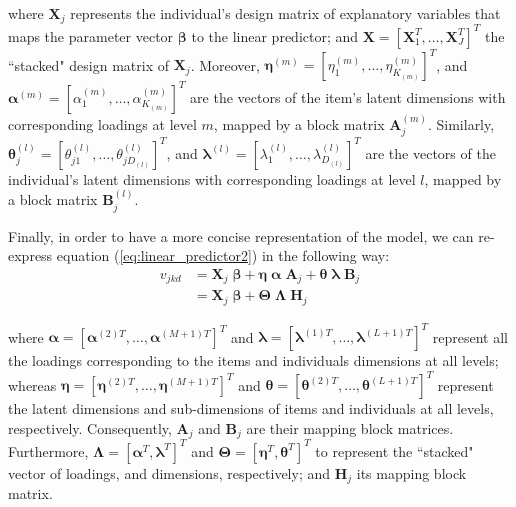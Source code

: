 \noindent where $\mathbf{X}_{j}$ represents the individual's design matrix of explanatory variables that maps the parameter vector $\pmb{\beta}$ to the linear predictor; and $\mathbf{X} = [ \mathbf{X}_{1}^{T}, \dots, \mathbf{X}_{J}^{T} ]^{T}$ the ``stacked" design matrix of $\mathbf{X}_{j}$. Moreover, $\pmb{\eta}^{(m)} = [ \eta_{1}^{(m)}, \dots, \eta_{K_{(m)}}^{(m)} ]^{T}$, and  $\pmb{\alpha}^{(m)} = [ \alpha_{1}^{(m)}, \dots, \alpha_{K_{(m)}}^{(m)} ]^{T}$ are the vectors of the item's latent dimensions with corresponding loadings at level $m$, mapped by a block matrix $\mathbf{A}_{j}^{(m)}$. Similarly, $\pmb{\theta}_{j}^{(l)} = [ \theta_{j1}^{(l)}, \dots, \theta_{jD_{(l)}}^{(l)} ]^{T}$, and  $\pmb{\lambda}^{(l)} = [ \lambda_{1}^{(l)}, \dots, \lambda_{D_{(l)}}^{(l)} ]^{T}$ are the vectors of the individual's latent dimensions with corresponding loadings at level $l$, mapped by a block matrix $\mathbf{B}_{j}^{(l)}$.

Finally, in order to have a more concise representation of the model, we can re-express equation (\ref{eq:linear_predictor2}) in the following way:
%
\begin{equation} \label{eq:linear_predictor3}
	\begin{split}
		v_{jkd} &= \mathbf{X}_{j} \; \pmb{\beta} + \pmb{\eta} \; \pmb{\alpha} \; \mathbf{A}_{j} + \pmb{\theta} \; \pmb{\lambda} \; \mathbf{B}_{j} \\
		&= \mathbf{X}_{j} \; \pmb{\beta} + \pmb{\Theta} \; \pmb{\Lambda} \; \mathbf{H}_{j}
	\end{split}
\end{equation}

\noindent where $\pmb{\alpha} = [ \pmb{\alpha}^{(2)T}, \dots, \pmb{\alpha}^{(M+1)T} ]^{T}$ and $\pmb{\lambda} = [ \pmb{\lambda}^{(1)T}, \dots, \pmb{\lambda}^{(L+1)T} ]^{T}$ represent all the loadings corresponding to the items and individuals dimensions at all levels; whereas $\pmb{\eta} = [ \pmb{\eta}^{(2)T}, \dots, \pmb{\eta}^{(M+1)T} ]^{T}$ and $\pmb{\theta} = [ \pmb{\theta}^{(2)T}, \dots, \pmb{\theta}^{(L+1)T} ]^{T}$ represent the latent dimensions and sub-dimensions of items and individuals at all levels, respectively. Consequently, $\mathbf{A}_{j}$ and $\mathbf{B}_{j}$ are their mapping block matrices. Furthermore, $\pmb{\Lambda} = [ \pmb{\alpha}^{T}, \pmb{\lambda}^{T} ]^{T}$ and $\pmb{\Theta} = [ \pmb{\eta}^{T}, \pmb{\theta}^{T} ]^{T}$ to represent the ``stacked" vector of loadings, and dimensions, respectively; and $\mathbf{H}_{j}$ its mapping block matrix.


